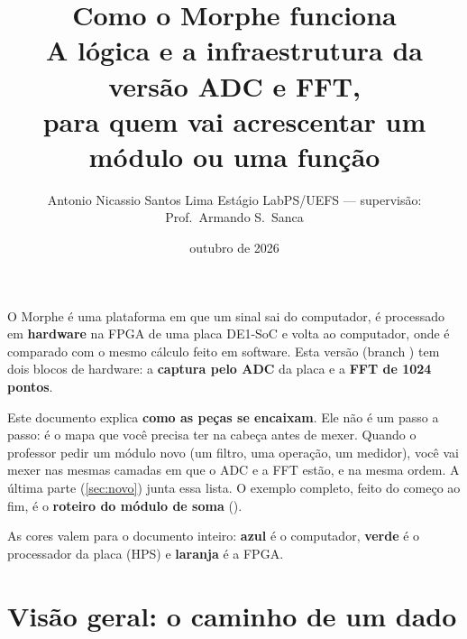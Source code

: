 \documentclass[11pt,a4paper,oneside]{article}
\title{\textbf{Como o Morphe funciona}\\[3pt]
  \large A lógica e a infraestrutura da versão ADC e FFT,\\
  para quem vai acrescentar um módulo ou uma função}
\author{Antonio Nicassio Santos Lima \quad
  {\small Estágio LabPS/UEFS --- supervisão: Prof.\ Armando S.\ Sanca}}
\date{outubro de 2026}
\begin{document}
\maketitle

O Morphe é uma plataforma em que um sinal sai do computador, é processado em
\textbf{hardware} na FPGA de uma placa DE1-SoC e volta ao computador, onde é
comparado com o mesmo cálculo feito em software. Esta versão (branch
) tem dois blocos de hardware: a \textbf{captura pelo ADC}
da placa e a \textbf{FFT de 1024 pontos}.

Este documento explica \textbf{como as peças se encaixam}. Ele não é um passo a
passo: é o mapa que você precisa ter na cabeça antes de mexer. Quando o
professor pedir um módulo novo (um filtro, uma operação, um medidor), você vai
mexer nas mesmas camadas em que o ADC e a FFT estão, e na mesma ordem. A
última parte (\ref{sec:novo}) junta essa lista. O exemplo completo, feito do
começo ao fim, é o \textbf{roteiro do módulo de soma} ().

\begin{center}
\end{center}

As cores valem para o documento inteiro: \textcolor{cli}{\textbf{azul}} é o
computador, \textcolor{hps}{\textbf{verde}} é o processador da placa (HPS) e
\textcolor{fpga}{\textbf{laranja}} é a FPGA.

\tableofcontents

\section{Visão geral: o caminho de um dado}
\end{document}
